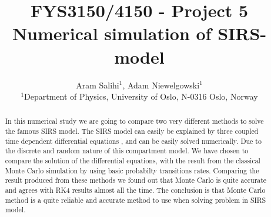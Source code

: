 \documentclass[a4paper, 10pt]{article}
\title{FYS3150/4150 - Project 5 \\
  Numerical simulation of SIRS-model}
\author{Aram Salihi$^1$, Adam Niewelgowski$^1$ \\
  \small $^1$Department of Physics, University of Oslo, N-0316 Oslo, Norway}
\begin{document}
\maketitle
\begin{abstract} In this numerical study we are going to compare two very different
  methods to solve the famous SIRS model. The SIRS model can easily be explained by three coupled time dependent
   differential equations , and can be easily solved numerically. Due to the discrete and random nature of this compartment model. We have chosen to
   compare the solution of the differential equations, with the result from the classical Monte Carlo simulation by using basic probabilty transitions rates.
   Comparing the result produced from these methods we found out that Monte Carlo is quite accurate and agrees with RK4 results almost all the time.
   The conclusion is that Monte Carlo method is a quite reliable and accurate method to use when solving problem in SIRS model.
\end{abstract}
\tableofcontents
\newpage
\end{document}
